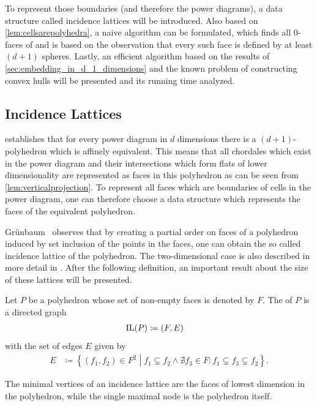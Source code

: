 To represent those boundaries (and therefore the power diagrams), a data structure called incidence lattices will be introduced.
Also based on \cref{lem:cellsarepolyhedra}, a naive algorithm can be formulated, which finds all $0$-faces of and is based on the observation that every such face is defined by at least $(d+1)$ spheres.
Lastly, an efficient algorithm based on the results of \cref{sec:embedding_in_d_1_dimensions} and the known problem of constructing convex hulls will be presented and its running time analyzed.

\subsection{Incidence Lattices}
\label{sub:incidence_lattices}
 establishes that for every power diagram in $d$ dimensions there is a $(d+1)$-polyhedron which is affinely equivalent.
This means that all chordales which exist in the power diagram and their intersections which form flats of lower dimensionality are represented as faces in this polyhedron as can be seen from \cref{lem:verticalprojection}.
To represent all faces which are boundaries of cells in the power diagram, one can therefore choose a data structure which represents the faces of the equivalent polyhedron.

Grünbaum~\cite{grunbaum2003convex} observes that by creating a partial order on faces of a polyhedron induced by set inclusion of the points in the faces, one can obtain the so called incidence lattice of the polyhedron.
The two-dimensional case is also described in more detail in \cite{edelsbrunner1986constructing}.
After the following definition, an important result about the size of these lattices will be presented.

\begin{definition}
    \label{def:incidencelattice}
    Let $P$ be a polyhedron whose set of non-empty faces is denoted by $F$.
    The  of $P$ is a directed graph
    \begin{align}
        \operatorname{IL}(P) &\coloneqq (F, E)
    \end{align}
    with the set of edges $E$ given by
    \begin{align}
        E &\coloneqq \left\{ (f_1, f_2) \in F^2 \middle| f_1 \subsetneq f_2 \wedge \nexists f_3 \in F : f_1 \subsetneq f_3 \subsetneq f_2 \right\}.
    \end{align}
\end{definition}
The minimal vertices of an incidence lattice are the faces of lowest dimension in the polyhedron, while the single maximal node is the polyhedron itself.

